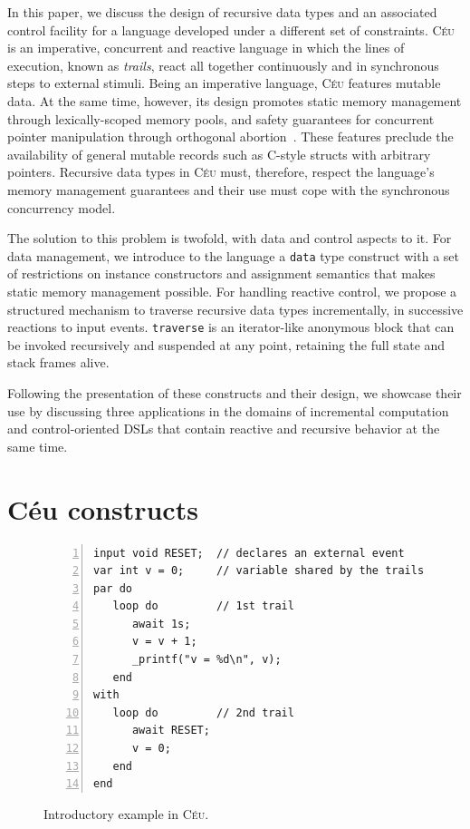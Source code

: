 \documentclass{sig-alternate}
\newcommand{\CEU}{\textsc{C\'{e}u}\xspace}
\newcommand{\code}[1] {{\small{\texttt{#1}}}}
\begin{document}
In this paper, we discuss the design of recursive data types and an associated
control facility for a language developed under a different set of
constraints. \CEU~\cite{ceu.sensys13} is an imperative, concurrent and
reactive language in which the lines of execution, known as \emph{trails},
react all together continuously and in synchronous steps to external stimuli.
Being an imperative language, \CEU features mutable data. At the same time,
however, its design promotes static memory management through lexically-scoped
memory pools, and safety guarantees for concurrent pointer manipulation
through orthogonal abortion~\cite{ceu.mod15}. These features preclude the
availability of general mutable records such as C-style structs with arbitrary
pointers. Recursive data types in \CEU must, therefore, respect the language's
memory management guarantees and their use must cope with the synchronous
concurrency model.

The solution to this problem is twofold, with data and control aspects to it.
For data management, we introduce to the language a \code{data} type construct
with a set of restrictions on instance constructors and assignment semantics
that makes static memory management possible. For handling reactive control,
we propose a structured mechanism to traverse recursive data types
incrementally, in successive reactions to input events. \code{traverse} is an
iterator-like anonymous block that can be invoked recursively and suspended at
any point, retaining the full state and stack frames alive.

Following the presentation of these constructs and their design, we showcase
their use by discussing three applications in the domains of incremental
computation and control-oriented DSLs that contain reactive and recursive
behavior at the same time.

\section{C\'eu constructs}

\begin{figure}%
\begin{lstlisting}[numbers=left,xleftmargin=3em]
input void RESET;  // declares an external event
var int v = 0;     // variable shared by the trails
par do
   loop do         // 1st trail
      await 1s;
      v = v + 1;
      _printf("v = %d\n", v);
   end
with
   loop do         // 2nd trail
      await RESET;
      v = 0;
   end
end
\end{lstlisting}
\caption{ Introductory example in \CEU.
\label{lst.intro}
}
\end{figure}
\end{document}

